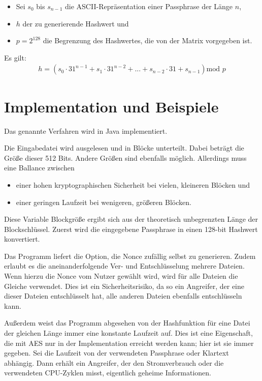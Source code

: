 \documentclass[10pt,a4paper]{article}
\begin{document}
\begin{itemize}
    \item Sei $s_0$ bis $s_{n-1}$ die ASCII-Repräsentation einer Passphrase der Länge $n$,
    \item $h$ der zu generierende Hashwert und
    \item $p = 2^{128}$ die Begrenzung des Hashwertes, die von der Matrix vorgegeben ist.
\end{itemize}
Es gilt:
\begin{align*}
    h = \left( s_0 \cdot 31^{n-1} + s_1 \cdot 31^{n-2} + ... + s_{n-2} \cdot 31 + s_{n-1}\right)\text{mod } p
\end{align*}

\section{Implementation und Beispiele}

Das genannte Verfahren wird in Java implementiert.

Die Eingabedatei wird ausgelesen und in Blöcke unterteilt.
Dabei beträgt die Größe dieser 512 Bits.
Andere Größen sind ebenfalls möglich.
Allerdings muss eine Ballance zwischen
\begin{itemize}
    \item einer hohen kryptographischen Sicherheit bei vielen, kleineren Blöcken und
    \item einer geringen Laufzeit bei wenigeren, größeren Blöcken.
\end{itemize}

Diese Variable Blockgröße ergibt sich aus der theoretisch unbegrenzten Länge der Blockschlüssel.
Zuerst wird die eingegebene Passphrase in einen 128-bit Hashwert konvertiert.

Das Programm liefert die Option, die Nonce zufällig selbst zu generieren.
Zudem erlaubt es die aneinanderfolgende Ver- und Entschlüsselung mehrere Dateien.
Wenn hierzu die Nonce vom Nutzer gewählt wird, wird für alle Dateien die Gleiche verwendet.
Dies ist ein Sicherheitsrisiko, da so ein Angreifer, der eine dieser Dateien entschlüsselt hat, alle anderen Dateien ebenfalls entschlüsseln kann.

Außerdem weist das Programm abgesehen von der Hashfunktion für eine Datei der gleichen Länge immer eine konstante Laufzeit auf.
Dies ist eine Eigenschaft, die mit AES nur in der Implementation erreicht werden kann\cite{Pitchaiah2012}; hier ist sie immer gegeben.
Sei die Laufzeit von der verwendeten Passphrase oder Klartext abhängig.
Dann erhält ein Angreifer, der den Stromverbrauch oder die verwendeten CPU-Zyklen misst, eigentlich geheime Informationen.
\end{document}
